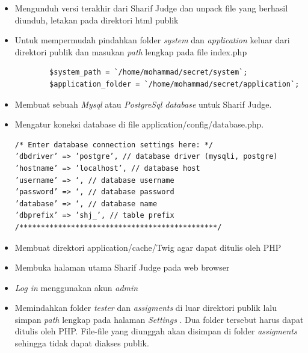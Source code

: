\begin{itemize}
    \item Mengunduh versi terakhir dari Sharif Judge dan unpack file yang berhasil diunduh, letakan pada direktori html publik
    \item Untuk mempermudah pindahkan folder \textit{system}  dan \textit{application} keluar dari direktori publik dan masukan \textit{path} lengkap pada file index.php
    \vspace{-2mm}
    \begin{verbatim}
        $system_path = `/home/mohammad/secret/system`;
        $application_folder = `/home/mohammad/secret/application`;
    \end{verbatim}
    \vspace{-5mm}
    \item Membuat sebuah \textit{Mysql} atau \textit{PostgreSql database} untuk Sharif Judge.
    \item Mengatur koneksi database di file application/config/database.php.
    \vspace{-2mm}
    \begin{verbatim}
/* Enter database connection settings here: */
’dbdriver’ => ’postgre’, // database driver (mysqli, postgre)
’hostname’ => ’localhost’, // database host
’username’ => ‘, // database username
’password’ => ‘, // database password
’database’ => ‘, // database name
’dbprefix’ => ’shj_’, // table prefix
/**********************************************/
    \end{verbatim}
    \vspace{-5mm}
    \item Membuat direktori application/cache/Twig agar dapat ditulis oleh PHP
    \item Membuka halaman utama Sharif Judge pada web browser \item \textit{Log in}  menggunakan akun \textit{admin}
    \item Memindahkan folder \textit{tester} dan \textit{assigments} di luar direktori publik lalu simpan \textit{path} lengkap pada halaman \textit{Settings} . Dua folder tersebut harus dapat ditulis oleh PHP. File-file yang diunggah akan disimpan di folder \textit{assigments} sehingga tidak dapat diakses publik.
\end{itemize}

